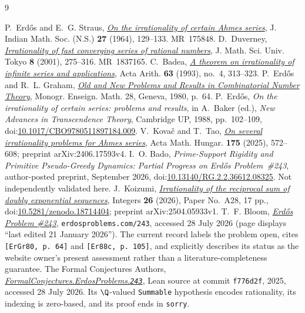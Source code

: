 \documentclass[11pt]{article}
\begin{document}
\begin{thebibliography}{9}
\small
\raggedright
\setlength{\itemsep}{0pt}
 P.~Erd\H{o}s and E.~G. Straus,
  \href{https://users.renyi.hu/~p_erdos/1964-19.pdf}{\emph{On the irrationality
  of certain Ahmes series}},
  J. Indian Math. Soc. (N.S.) \textbf{27} (1964), 129--133. MR~175848.
 D.~Duverney,
  \href{https://www.ms.u-tokyo.ac.jp/journal/pdf/jms080206.pdf}
  {\emph{Irrationality of fast converging series of rational numbers}},
  J. Math. Sci. Univ. Tokyo \textbf{8} (2001), 275--316. MR~1837165.
 C.~Badea,
  \href{https://matwbn.icm.edu.pl/ksiazki/aa/aa63/aa6342.pdf}{\emph{A theorem
  on irrationality of infinite series and applications}}, Acta Arith.
  \textbf{63} (1993), no.~4, 313--323.
 P.~Erd\H{o}s and R.~L. Graham,
  \href{https://mathweb.ucsd.edu/~ronspubs/80_11_number_theory.pdf}{\emph{Old
  and New Problems and Results in Combinatorial Number Theory}},
  Monogr. Enseign. Math. 28, Geneva, 1980, p.~64.
 P.~Erd\H{o}s, \emph{On the irrationality of certain series:
  problems and results}, in A.~Baker (ed.), \emph{New Advances in Transcendence
  Theory}, Cambridge UP, 1988, pp.~102--109,
  doi:\href{https://doi.org/10.1017/CBO9780511897184.009}{10.1017/CBO9780511897184.009}.
 V.~Kova\v{c} and T.~Tao,
  \href{https://arxiv.org/abs/2406.17593}{\emph{On several irrationality
  problems for Ahmes series}}, Acta Math. Hungar. \textbf{175} (2025),
  572--608; preprint arXiv:2406.17593v4.
 I.~O. Bado,
  \emph{Prime-Support Rigidity and Primitive Pseudo-Greedy Dynamics:
  Partial Progress on Erd\H{o}s Problem~\#243}, author-posted preprint,
  September 2026, doi:\href{https://doi.org/10.13140/RG.2.2.36612.08325}
  {10.13140/RG.2.2.36612.08325}.  Not independently validated here.
 J.~Koizumi,
  \href{https://math.colgate.edu/~integers/aa28/aa28.pdf}
  {\emph{Irrationality of the reciprocal sum of doubly exponential sequences}},
  Integers \textbf{26} (2026), Paper No.~A28, 17 pp.,
  doi:\href{https://doi.org/10.5281/zenodo.18714404}{10.5281/zenodo.18714404};
  preprint arXiv:2504.05933v1.
 T.~F. Bloom,
  \href{https://www.erdosproblems.com/243}{\emph{Erd\H{o}s Problem \#243}},
  \texttt{erdosproblems.com/243}, accessed 28 July 2026 (page displays
  ``last edited 21 January 2026'').  The current record labels the problem
  open, cites \texttt{[ErGr80, p.~64]} and \texttt{[Er88c, p.~105]}, and
  explicitly describes its status as the website owner's present assessment
  rather than a literature-completeness guarantee.
 The Formal Conjectures Authors,
  \href{https://github.com/google-deepmind/formal-conjectures/blob/f776d2f2039351b00737ffcafb9d7d7666e1d9af/FormalConjectures/ErdosProblems/243.lean}
  {\emph{FormalConjectures.ErdosProblems.\texttt{243}}},
  Lean source at commit \texttt{f776d2f}, 2025, accessed 28 July 2026.
  Its $\Q$-valued \texttt{Summable} hypothesis encodes rationality, its
  indexing is zero-based, and its proof ends in \texttt{sorry}.
\end{thebibliography}
\end{document}
